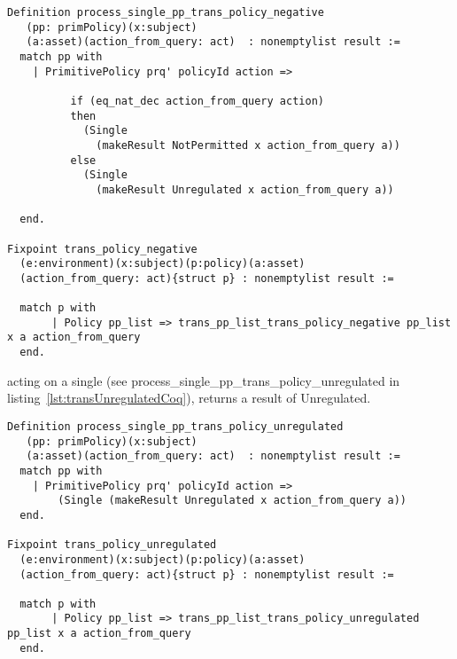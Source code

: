 \begin{lstlisting}
Definition process_single_pp_trans_policy_negative
   (pp: primPolicy)(x:subject)
   (a:asset)(action_from_query: act)  : nonemptylist result :=
  match pp with
    | PrimitivePolicy prq' policyId action =>
 
          if (eq_nat_dec action_from_query action)
          then
            (Single 
              (makeResult NotPermitted x action_from_query a))
          else
            (Single 
              (makeResult Unregulated x action_from_query a))

  end.

Fixpoint trans_policy_negative
  (e:environment)(x:subject)(p:policy)(a:asset)
  (action_from_query: act){struct p} : nonemptylist result :=
  
  match p with  
       | Policy pp_list => trans_pp_list_trans_policy_negative pp_list x a action_from_query
  end.
\end{lstlisting}


 acting on a single  (see process_single_pp_trans_policy_unregulated in listing~\ref{lst:transUnregulatedCoq}), returns a result of Unregulated.

\begin{lstlisting}
Definition process_single_pp_trans_policy_unregulated
   (pp: primPolicy)(x:subject)
   (a:asset)(action_from_query: act)  : nonemptylist result :=
  match pp with
    | PrimitivePolicy prq' policyId action =>
        (Single (makeResult Unregulated x action_from_query a))
  end.

Fixpoint trans_policy_unregulated
  (e:environment)(x:subject)(p:policy)(a:asset)
  (action_from_query: act){struct p} : nonemptylist result :=

  match p with
       | Policy pp_list => trans_pp_list_trans_policy_unregulated pp_list x a action_from_query
  end.

\end{lstlisting}



